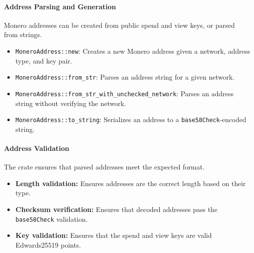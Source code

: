 \documentclass[12pt,a4paper]{article}
\begin{document}

\paragraph{Address Parsing and Generation}

Monero addresses can be created from public spend and view keys, or parsed from strings. %

\begin{itemize}
    \item \texttt{MoneroAddress::new}: Creates a new Monero address given a network, address type, and key pair.
    \item \texttt{MoneroAddress::from\_str}: Parses an address string for a given network.
    \item \texttt{MoneroAddress::from\_str\_with\_unchecked\_network}: Parses an address string without verifying the network.
    \item \texttt{MoneroAddress::to\_string}: Serializes an address to a \texttt{base58Check}-encoded string.
\end{itemize}

\paragraph{Address Validation}

The crate ensures that parsed addresses meet the expected format. %

\begin{itemize}
    \item \textbf{Length validation:} Ensures addresses are the correct length based on their type.
    \item \textbf{Checksum verification:} Ensures that decoded addresses pass the \texttt{base58Check} validation.
    \item \textbf{Key validation:} Ensures that the spend and view keys are valid Edwards25519 points.
\end{itemize}
\end{document}
